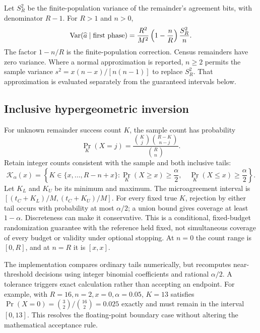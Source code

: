 Let $S_R^2$ be the finite-population variance of the remainder's agreement
bits, with denominator $R-1$. For $R>1$ and $n>0$,
\begin{equation}
 \operatorname{Var}(\widehat a\mid\hbox{first phase})
 =\frac{R^2}{M^2}\left(1-\frac{n}{R}\right)\frac{S_R^2}{n}.
 \label{app:eq:fpc}
\end{equation}
The factor $1-n/R$ is the finite-population correction. Census remainders
have zero variance. Where a normal approximation is reported, $n\geq2$
permits the sample variance
$s^2=x(n-x)/[n(n-1)]$ to replace $S_R^2$. That approximation is evaluated
separately from the guaranteed intervals below.

\subsection{Inclusive hypergeometric inversion}
\label{app:hypergeom-ci}

For unknown remainder success count $K$, the sample count has probability
\begin{equation}
 \Pr_K(X=j)=\frac{\binom{K}{j}\binom{R-K}{n-j}}{\binom{R}{n}}.
 \label{app:eq:hg-pmf}
\end{equation}
Retain integer counts consistent with the sample and both inclusive tails:
\begin{equation}
 \mathcal K_\alpha(x)=
 \left\{K\in\{x,\ldots,R-n+x\}:
 \Pr_K(X\geq x)\geq\frac{\alpha}{2},\quad
 \Pr_K(X\leq x)\geq\frac{\alpha}{2}\right\}.
 \label{app:eq:hg-set}
\end{equation}
Let $K_L$ and $K_U$ be its minimum and maximum. The microagreement interval
is $[(t_C+K_L)/M,(t_C+K_U)/M]$. For every fixed true $K$, rejection by either
tail occurs with probability at most $\alpha/2$; a union bound gives coverage
at least $1-\alpha$. Discreteness can make it conservative. This is a
conditional, fixed-budget randomization guarantee with the reference held
fixed, not simultaneous coverage of every budget or validity under optional
stopping. At $n=0$ the count range is $[0,R]$, and at $n=R$ it is $[x,x]$.

The implementation compares ordinary tails numerically, but recomputes
near-threshold decisions using integer binomial coefficients and rational
$\alpha/2$. A tolerance triggers exact calculation rather than accepting an
endpoint. For example, with $R=16,n=2,x=0,\alpha=0.05$,
$K=13$ satisfies $\Pr(X=0)=\binom{3}{2}/\binom{16}{2}=0.025$ exactly and
must remain in the interval $[0,13]$. This resolves the floating-point
boundary case without altering the mathematical acceptance rule.

